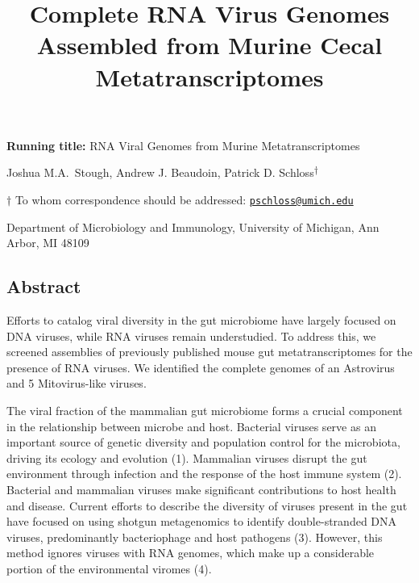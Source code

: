 \documentclass[11pt,]{article}
\title{\textbf{Complete RNA Virus Genomes Assembled from Murine Cecal
Metatranscriptomes}}
\date{}
\begin{document}
\maketitle

\vspace{35mm}

\textbf{Running title:} RNA Viral Genomes from Murine Metatranscriptomes

\vspace{35mm}

Joshua M.A.~Stough, Andrew J. Beaudoin, Patrick D.
Schloss\textsuperscript{\(\dagger\)}

\vspace{40mm}

\(\dagger\) To whom correspondence should be addressed:
\href{mailto:pschloss@umich.edu}{\nolinkurl{pschloss@umich.edu}}

Department of Microbiology and Immunology, University of Michigan, Ann
Arbor, MI 48109

\newpage
\linenumbers

\hypertarget{abstract}{%
\subsection{Abstract}\label{abstract}}

Efforts to catalog viral diversity in the gut microbiome have largely
focused on DNA viruses, while RNA viruses remain understudied. To
address this, we screened assemblies of previously published mouse gut
metatranscriptomes for the presence of RNA viruses. We identified the
complete genomes of an Astrovirus and 5 Mitovirus-like viruses.

\newpage

The viral fraction of the mammalian gut microbiome forms a crucial
component in the relationship between microbe and host. Bacterial
viruses serve as an important source of genetic diversity and population
control for the microbiota, driving its ecology and evolution (1).
Mammalian viruses disrupt the gut environment through infection and the
response of the host immune system (2). Bacterial and mammalian viruses
make significant contributions to host health and disease. Current
efforts to describe the diversity of viruses present in the gut have
focused on using shotgun metagenomics to identify double-stranded DNA
viruses, predominantly bacteriophage and host pathogens (3). However,
this method ignores viruses with RNA genomes, which make up a
considerable portion of the environmental viromes (4).
\end{document}
